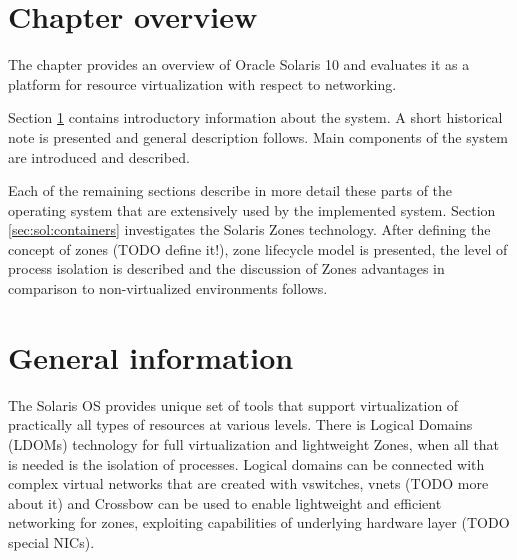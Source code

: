 \documentclass[11pt]{book}
\begin{document}
    \section*{Chapter overview}

      The chapter provides an overview of Oracle Solaris 10 and evaluates it as a platform for resource virtualization
      with respect to networking.

      Section \ref{sec:sol:general} contains introductory information about the system. A short historical note is
      presented and general description follows. Main components of the system are introduced and described.
      
      Each of the remaining sections describe in more detail these parts of the operating system that are extensively
      used by the implemented system. Section \ref{sec:sol:containers} investigates the Solaris Zones technology. After
      defining the concept of zones (TODO define it!), zone lifecycle model is presented, the level of process isolation
      is described and the discussion of Zones advantages in comparison to non-virtualized environments follows.



    \section{General information}
    \label{sec:sol:general}




      The Solaris OS provides unique set of tools that support virtualization of practically all types of resources at
      various levels. There is Logical Domains (LDOMs) technology for full virtualization and lightweight Zones, when
      all that is needed is the isolation of processes. Logical domains can be connected with complex virtual networks
      that are created with vswitches, vnets (TODO more about it) and Crossbow can be used to enable lightweight and
      efficient networking for zones, exploiting capabilities of underlying hardware layer (TODO special NICs).
\end{document}
